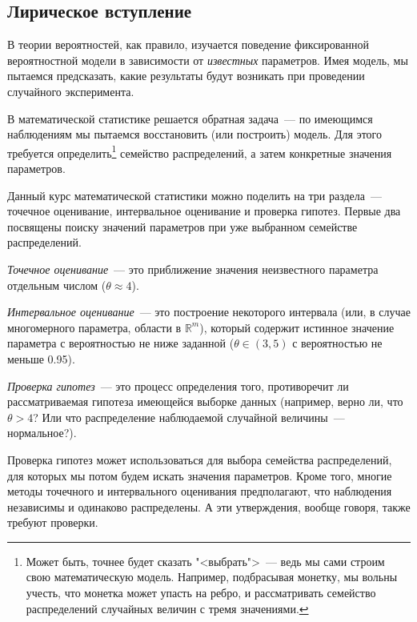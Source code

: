 \subsection*{Лирическое вступление}
В теории вероятностей, как правило, изучается поведение фиксированной вероятностной модели в зависимости от \textit{известных} параметров.
Имея модель, мы пытаемся предсказать, какие результаты будут возникать при проведении случайного эксперимента.

В математической статистике решается обратная задача~--- по имеющимся наблюдениям мы пытаемся восстановить (или построить) модель.
Для этого требуется определить\footnote{Может быть, точнее будет сказать "<выбрать">~--- ведь мы сами строим свою математическую модель.
Например, подбрасывая монетку, мы вольны учесть, что монетка может упасть на ребро, и рассматривать семейство распределений случайных величин с тремя значениями.}
семейство распределений, а затем конкретные значения параметров.

Данный курс математической статистики можно поделить на три раздела~--- точечное оценивание, интервальное оценивание и проверка гипотез.
Первые два посвящены поиску значений параметров при уже выбранном семействе распределений. 

\textit{Точечное оценивание}~--- это приближение значения неизвестного параметра отдельным числом ($\theta \approx 4$).

\textit{Интервальное оценивание}~--- это построение некоторого интервала (или, в случае многомерного параметра, области в $\mathbb{R}^m$), который содержит истинное значение параметра с вероятностью не ниже заданной ($\theta \in (3, 5)$ с вероятностью не меньше 0.95). 

\textit{Проверка гипотез}~--- это процесс определения того, противоречит ли рассматриваемая гипотеза имеющейся выборке данных (например, верно ли, что $\theta > 4$? 
Или что распределение наблюдаемой случайной величины~--- нормальное?).

Проверка гипотез может использоваться для выбора семейства распределений, для которых мы потом будем искать значения параметров.
Кроме того, многие методы точечного и интервального оценивания предполагают, что наблюдения независимы и одинаково распределены.
А эти утверждения, вообще говоря, также требуют проверки.
